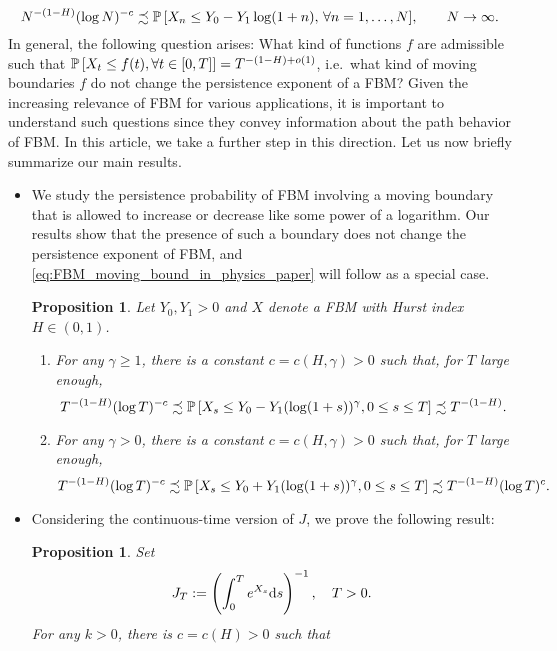 \documentclass[11pt]{article}
\theoremstyle{plain}
\newtheorem{prop}[thm]{Proposition}
\theoremstyle{definition}
\begin{document}
\begin{equation}\label{eq:FBM_moving_bound_in_physics_paper}
    N^{-(1-H)} (\log N)^{-c} \precsim {{{\bf {\mathbb{P}}}}\left[{X_n \le Y_0 - Y_1 \log(1+n), \, \forall n = 1,\dots,N}\right]}, \qquad N \to \infty.
\end{equation}
In general, the following question arises: What kind of functions $f$ are admissible such that ${{{\bf {\mathbb{P}}}}\left[{X_t \le f(t), \forall t \in [0,T]}\right]} = T^{-(1-H) + o(1)}$, i.e.\ what kind of moving boundaries $f$ do not change the persistence exponent of a FBM? Given the increasing relevance of FBM for various applications, it is important to understand such questions since they convey information about the path behavior of FBM. In this article, we take a further step in this direction. Let us now briefly summarize our main results.
\begin{itemize}
   \item We study the persistence probability of FBM involving a moving boundary that is allowed to increase or decrease like some power of a logarithm. Our results show that the presence of such a boundary does not change the persistence exponent of FBM, and \eqref{eq:FBM_moving_bound_in_physics_paper} will follow as a special case. 
\begin{prop}\label{prop:FBM_log_boundary}
   Let $Y_0,Y_1>0$ and $X$ denote a FBM with Hurst index $H \in (0,1)$.
\begin{enumerate}
   \item  For any $\gamma \ge 1$, there is a constant $c = c(H,\gamma) >0$ such that, for $T$ large enough,
$$
T^{-(1-H)} (\log T)^{-c} \precsim {{{\bf {\mathbb{P}}}}\left[{X_s\leq Y_0 - Y_1 (\log (1 + s))^\gamma, 0\leq  s\leq T}\right]} \precsim T^{-(1-H)}.
$$
\item  For any $\gamma > 0$, there is a constant $c = c(H,\gamma) > 0$ such that, for $T$ large enough,
$$
T^{-(1-H)} (\log T)^{-c} \precsim {{{\bf {\mathbb{P}}}}\left[{X_s\leq Y_0 + Y_1 (\log (1 + s))^\gamma, 0\leq  s\leq T}\right]} \precsim T^{-(1-H)} (\log T)^{c}.
$$
\end{enumerate}
\end{prop}
\item Considering the continuous-time version of $J$, we prove the following result:
\begin{prop}\label{prop:moment_disorder_current_functional}
  Set
\[
   J_T := \left( \int_0^T e^{X_s} {{\rm d}} s \right)^{-1}, \quad T > 0.
\]
For any $k > 0$, there is $c = c(H) > 0$ such that 
\begin{equation}

\end{equation}
\end{prop}
\end{itemize}
\end{document}
